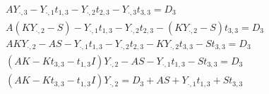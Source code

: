 \documentclass[]{article}
\begin{document}
\begin{gather}
AY_{\cdot,3} -  Y_{\cdot,1}t_{1,3} -	Y_{\cdot,2}t_{2,3} -	Y_{\cdot,3}t_{3,3}= D_{3}\\
A(KY_{\cdot,2}-S) -  Y_{\cdot,1}t_{1,3} -	Y_{\cdot,2}t_{2,3} -	(KY_{\cdot,2}-S) t_{3,3}= D_{3}\\
AKY_{\cdot,2}-AS -  Y_{\cdot,1}t_{1,3} -	Y_{\cdot,2}t_{2,3} -	KY_{\cdot,2}t_{3,3}-St_{3,3} = D_{3}\\
(AK-Kt_{3,3}-t_{1,3}I)Y_{\cdot,2}-AS - Y_{\cdot,1}t_{1,3} -St_{3,3} = D_{3}\\
(AK-Kt_{3,3}-t_{1,3}I)Y_{\cdot,2} = D_{3} + AS + Y_{\cdot,1}t_{1,3} + St_{3,3}\\
\end{gather}


%
%
%
%
%
%
%
%
\end{document}
